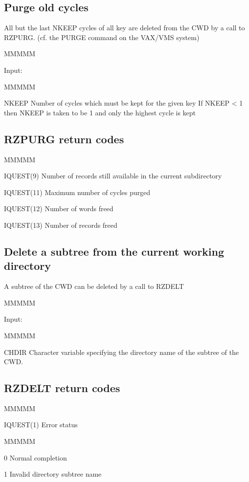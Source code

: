 \subsection{Purge old cycles}
\par All but the last NKEEP cycles of all
key are deleted from the CWD by a call to RZPURG.
(cf. the PURGE command on the VAX/VMS system)
\begin{DL}{MMMMM}
\item[Input:
]
\begin{DL}{MMMMM}
\item[NKEEP
]Number of cycles which must be kept for the given key
\newline If NKEEP < 1 then NKEEP is taken to be 1 and only the highest
cycle is kept
\end{DL}
\end{DL}
\subsection{RZPURG return codes}
\begin{DL}{MMMMM}
\item[IQUEST(9)
]Number of records still available in the current subdirectory
\par
\item[IQUEST(11)
]Maximum number of cycles purged
\item[IQUEST(12)
]Number of words freed
\item[IQUEST(13)
]Number of records freed
\end{DL}
\subsection{Delete a subtree from the current working directory}
\par A subtree of the CWD can be deleted by a call to RZDELT
\begin{DL}{MMMMM}
\item[Input:
]
\begin{DL}{MMMMM}
\item[CHDIR
]Character variable specifying the directory name of the subtree of
the CWD.
\end{DL}
\end{DL}
\subsection{RZDELT return codes}
\begin{DL}{MMMMM}
\item[IQUEST(1)
]Error status
\begin{DL}{MMMMM}
\item[ 0
]Normal completion
\item[ 1
]Invalid directory subtree name
\end{DL}
\end{DL}
